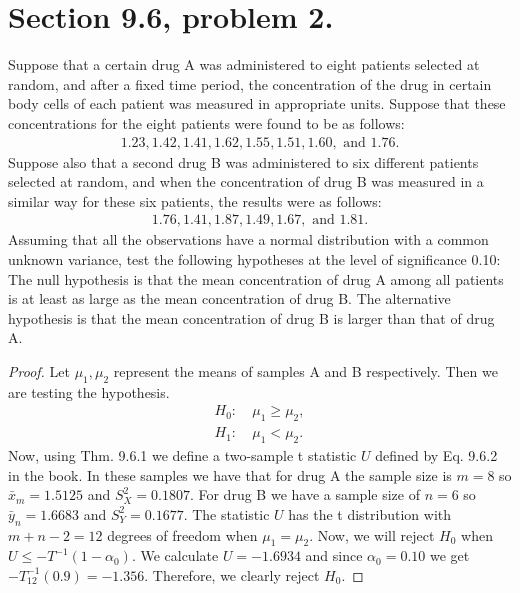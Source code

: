 \documentclass{article}
\newenvironment{hwproof}[1]
{
    #1
    \begin{proof}
}{
    \end{proof}
}
\begin{document}
\section{Section 9.6, problem 2.}
\begin{hwproof}
    {
        Suppose that a certain drug A was administered to eight patients selected at random,
        and after a fixed time period, the concentration of the drug in certain body
        cells of each patient was measured in appropriate units. Suppose that these
        concentrations for the eight patients were found to be as follows:
        \begin{gather*}
            1.23, 1.42, 1.41, 1.62, 1.55, 1.51, 1.60, \text{ and } 1.76.
        \end{gather*}
        Suppose also that a second drug B was administered to six different patients
        selected at random, and when the concentration of drug B was measured in a
        similar way for these six patients, the results were as follows:
        \begin{gather*}
            1.76, 1.41, 1.87, 1.49, 1.67, \text{ and } 1.81.
        \end{gather*}
        Assuming that all the observations have a normal distribution with a common
        unknown variance, test the following hypotheses at the level of significance
        0.10: The null hypothesis is that the mean concentration of drug A among
        all patients is at least as large as the mean concentration of drug B.
        The alternative hypothesis is that the mean concentration of drug B is larger
        than that of drug A.
    }
    Let $\mu_1, \mu_2$ represent the means of samples A and B respectively. Then
    we are testing the hypothesis.
    \begin{align*}
        H_0: & \ \mu_1 \geq \mu_2, \\
        H_1: & \ \mu_1 < \mu_2.
    \end{align*}
    Now, using Thm. 9.6.1 we define a two-sample t statistic $U$ defined by
    Eq. 9.6.2 in the book. In these samples we have that for drug A the sample size
    is $m = 8$ so $\bar{x}_m = 1.5125$ and $S_X^2 = 0.1807$. For drug B we have a
    sample size of $n=6$ so $\bar{y}_n = 1.6683$ and $S_Y^2 = 0.1677$. The
    statistic $U$ has the t distribution with $m + n -2 = 12$ degrees of freedom
    when $\mu_1 = \mu_2$. Now, we will reject $H_0$ when $U \leq -T^{-1}(1 - \alpha_0)$.
    We calculate $U = -1.6934$ and since $\alpha_0 = 0.10$ we get
    $-T_{12}^{-1}(0.9) = -1.356$. Therefore, we clearly reject $H_0$.
\end{hwproof}
\end{document}

